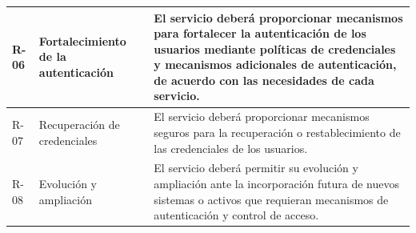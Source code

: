 \begin{longtable}{|
	>{\centering\arraybackslash}p{1.1cm}|
	>{\raggedright\arraybackslash}p{3.2cm}|
	>{\raggedright\arraybackslash}p{9.2cm}|}
	R-06                                &
	Fortalecimiento de la autenticación &
	El servicio deberá proporcionar mecanismos para fortalecer la autenticación de los usuarios mediante políticas de credenciales y mecanismos adicionales de autenticación, de acuerdo con las necesidades de cada servicio.
	\\
	\hline

	R-07                                &
	Recuperación de credenciales        &
	El servicio deberá proporcionar mecanismos seguros para la recuperación o restablecimiento de las credenciales de los usuarios.
	\\
	\hline

	R-08                                &
	Evolución y ampliación              &
	El servicio deberá permitir su evolución y ampliación ante la incorporación futura de nuevos sistemas o activos que requieran mecanismos de autenticación y control de acceso.
	\\
	\hline
\end{longtable}
\endgroup
